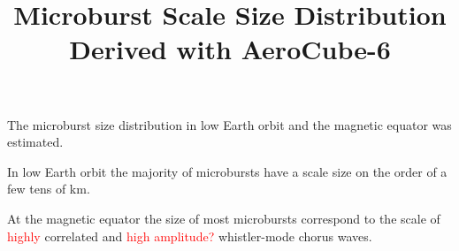 \documentclass[draft]{agujournal2019}
\begin{document}
\title{Microburst Scale Size Distribution Derived with AeroCube-6}

%
%






\begin{keypoints}
\item The microburst size distribution in low Earth orbit and the magnetic equator was estimated.
\item In low Earth orbit the majority of microbursts have a scale size on the order of a few tens of km.
\item At the magnetic equator the size of most microbursts correspond to the scale of \textcolor{red}{highly} correlated and \textcolor{red}{high amplitude?} whistler-mode chorus waves.
\end{keypoints}

%
%

\end{document}
